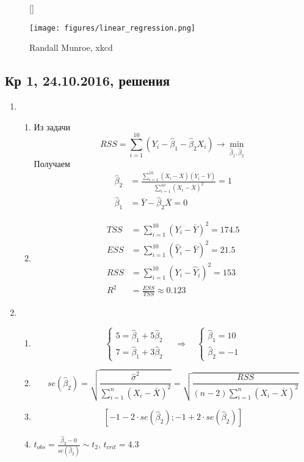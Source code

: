 \documentclass[12pt, a4paper]{article}
\theoremstyle{definition}
\begin{document}
\begin{figure}[h!]
[\FBwidth]
{\caption*{Randall Munroe, xkcd}}
{\texttt{[image: figures/linear\_regression.png]}}
\end{figure}



\subsection{Кр 1, 24.10.2016, решения}

\begin{enumerate}
\item
\begin{enumerate}
\item  Из задачи
\[
RSS = \sum_{i=1}^{10} \left (Y_i - \hat{\beta}_1 -\hat{\beta}_2 X_i  \right) \to \min_{\hat{\beta}_1, \hat{\beta}_2}
\]
Получаем
\begin{align*}
\hat{\beta}_2 &= \frac{\sum_{i=1}^{10} (X_i - \bar X)(Y_i - \bar Y)}{\sum_{i=1}^{10} (X_i - \bar X)^2} = 1 \\
\hat{\beta}_1 &= \bar Y - \hat{\beta}_2 \bar X = 0
\end{align*}
\item
\begin{align*}
TSS &= \sum_{i=1}^{10} \left(Y_i - \bar Y\right)^2  = 174.5 \\
ESS &= \sum_{i=1}^{10} \left(\hat{Y}_i - \bar Y\right)^2 = 21.5 \\
RSS &= \sum_{i=1}^{10} \left(Y_i - \hat{Y}_i\right)^2  = 153 \\
R^2 &= \frac{ESS}{TSS} \approx 0.123
\end{align*}
\end{enumerate}

\item
\begin{enumerate}
\item
\[
\begin{cases}
5 = \hat{\beta}_1 + 5 \hat{\beta}_2 \\
7 =  \hat{\beta}_1 + 3 \hat{\beta}_2
\end{cases}
\quad \Rightarrow \quad
\begin{cases}
\hat{\beta}_1 = 10 \\
\hat{\beta}_2 = -1
\end{cases}
\]
\item
\[
se\left(\hat{\beta}_2\right) = \sqrt{\frac{\hat{\sigma}^2}{\sum_{i=1}^{n} \left(X_i - \bar X \right)^2}} = \sqrt{\frac{RSS}{(n-2) \sum_{i=1}^{n} \left(X_i - \bar X \right)^2}}
\]
\item
\[
\left[-1 - 2 \cdot se\left(\hat{\beta}_2\right) ; -1 + 2 \cdot se\left(\hat{\beta}_2\right)  \right]
\]
\item
$t_{obs} = \frac{\hat{\beta}_2 - 0}{se\left(\hat{\beta}_2\right)} \sim t_2$, $t_{crit} = 4.3$
\end{enumerate}


\end{enumerate}
\end{document}
